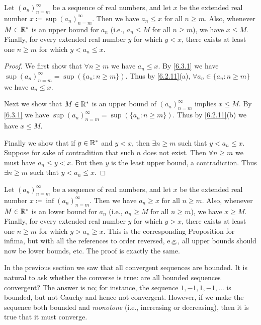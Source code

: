 \setcounter{thm}{5}
\begin{prop}\label{6.3.6}
  Let \((a_n)_{n = m}^\infty\) be a sequence of real numbers, and let \(x\) be the extended real number \(x \coloneqq \sup(a_n)_{n = m}^\infty\).
  Then we have \(a_n \leq x\) for all \(n \geq m\).
  Also, whenever \(M \in \mathbb{R}^*\) is an upper bound for \(a_n\) (i.e., \(a_n \leq M\) for all \(n \geq m\)), we have \(x \leq M\).
  Finally, for every extended real number \(y\) for which \(y < x\), there exists at least one \(n \geq m\) for which \(y < a_n \leq x\).
\end{prop}

\begin{proof}
  We first show that \(\forall n \geq m\) we have \(a_n \leq x\).
  By \cref{6.3.1} we have \(\sup(a_n)_{n = m}^\infty = \sup(\{a_n : n \geq m\})\).
  Thus by \cref{6.2.11}(a), \(\forall a_n \in \{a_n : n \geq m\}\) we have \(a_n \leq x\).

  Next we show that \(M \in \mathbb{R}^*\) is an upper bound of \((a_n)_{n = m}^\infty\) implies \(x \leq M\).
  By \cref{6.3.1} we have \(\sup(a_n)_{n = m}^\infty = \sup(\{a_n : n \geq m\})\).
  Thus by \cref{6.2.11}(b) we have \(x \leq M\).

  Finally we show that if \(y \in \mathbb{R}^*\) and \(y < x\), then \(\exists n \geq m\) such that \(y < a_n \leq x\).
  Suppose for sake of contradition that such \(n\) does not exist.
  Then \(\forall n \geq m\) we must have \(a_n \leq y < x\).
  But then \(y\) is the least upper bound, a contradiction.
  Thus \(\exists n \geq m\) such that \(y < a_n \leq x\).
\end{proof}

\begin{rmk}\label{6.3.7}
  Let \((a_n)_{n = m}^\infty\) be a sequence of real numbers, and let \(x\) be the extended real number \(x \coloneqq \inf(a_n)_{n = m}^\infty\).
  Then we have \(a_n \geq x\) for all \(n \geq m\).
  Also, whenever \(M \in \mathbb{R}^*\) is an lower bound for \(a_n\) (i.e., \(a_n \geq M\) for all \(n \geq m\)), we have \(x \geq M\).
  Finally, for every extended real number \(y\) for which \(y > x\), there exists at least one \(n \geq m\) for which \(y > a_n \geq x\).
  This is the corresponding Proposition for infima, but with all the references to order reversed, e.g., all upper bounds should now be lower bounds, etc.
  The proof is exactly the same.
\end{rmk}

\begin{note}
  In the previous section we saw that all convergent sequences are bounded.
  It is natural to ask whether the converse is true:
  are all bounded sequences convergent?
  The answer is no;
  for instance, the sequence \(1, -1, 1, -1, \dots\) is bounded, but not Cauchy and hence not convergent.
  However, if we make the sequence both bounded and \emph{monotone} (i.e., increasing or decreasing), then it is true that it must converge.
\end{note}

